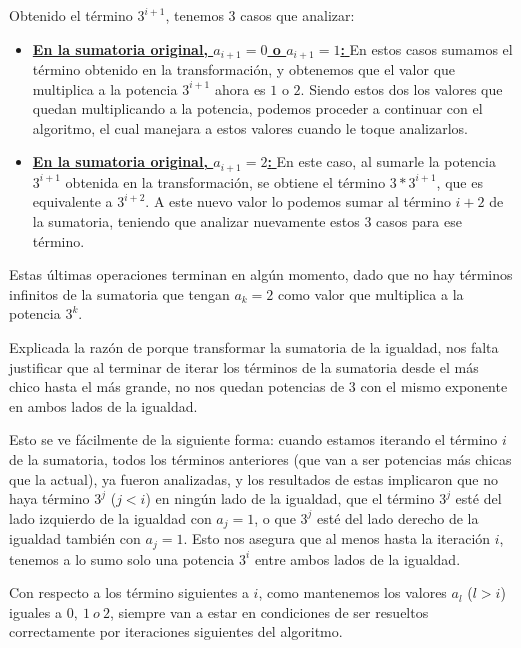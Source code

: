 Obtenido el término $3^{i+1}$, tenemos 3 casos que analizar: 

\begin{itemize}
    \item \underline{ \textbf{En la sumatoria original, $a_{i+1} = 0$ o $a_{i+1} = 1$: } } En estos casos sumamos el término obtenido en la transformación, y obtenemos que el valor que multiplica a la potencia $3^{i+1}$ ahora es $1$ o $2$. Siendo estos dos los valores que quedan multiplicando a la potencia, podemos proceder a continuar con el algoritmo, el cual manejara a estos valores cuando le toque analizarlos.
    
    \item \underline{ \textbf{En la sumatoria original, $a_{i+1} = 2$: }} En este caso, al sumarle la potencia $3^{i+1}$ obtenida en la transformación, se obtiene el término $3*3^{i+1}$, que es equivalente a $3^{i+2}$. A este nuevo valor lo podemos sumar al término $i+2$ de la sumatoria, teniendo que analizar nuevamente estos 3 casos para ese término.
   
\end{itemize}

Estas últimas operaciones terminan en algún momento, dado que no hay términos infinitos de la sumatoria que tengan $a_{k} = 2$ como valor que multiplica a la potencia $3^k$.

Explicada la razón de porque transformar la sumatoria de la igualdad, nos falta justificar que al terminar de iterar los términos de la sumatoria desde el más chico hasta el más grande, no nos quedan potencias de $3$ con el mismo exponente en ambos lados de la igualdad.

Esto se ve fácilmente de la siguiente forma: cuando estamos iterando el término $i$ de la sumatoria, todos los términos anteriores (que van a ser potencias más chicas que la actual), ya fueron analizadas, y los resultados de estas implicaron que no haya término $3^j$ ($j<i$) en ningún lado de la igualdad, que el término $3^j$ esté del lado izquierdo de la igualdad con $a_j = 1$, o que $3^j$ esté del lado derecho de la igualdad también con $a_j = 1$. Esto nos asegura que al menos hasta la iteración $i$, tenemos a lo sumo solo una potencia $3^i$ entre ambos lados de la igualdad.

Con respecto a los término siguientes a $i$, como mantenemos los valores $a_l$ ($l>i$) iguales a $0,~1~ o~ 2$, siempre van a estar en condiciones de ser resueltos correctamente por iteraciones siguientes del algoritmo.

